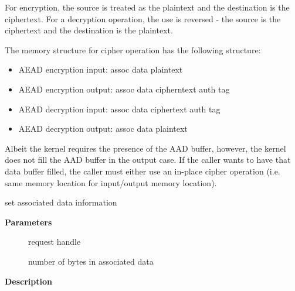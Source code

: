 \documentclass[a4paper,8pt,english]{sphinxmanual}
\begin{document}
For encryption, the source is treated as the plaintext and the
destination is the ciphertext. For a decryption operation, the use is
reversed - the source is the ciphertext and the destination is the plaintext.

The memory structure for cipher operation has the following structure:
\begin{itemize}
\item {} 
AEAD encryption input:  assoc data \textbar{}\textbar{} plaintext

\item {} 
AEAD encryption output: assoc data \textbar{}\textbar{} cipherntext \textbar{}\textbar{} auth tag

\item {} 
AEAD decryption input:  assoc data \textbar{}\textbar{} ciphertext \textbar{}\textbar{} auth tag

\item {} 
AEAD decryption output: assoc data \textbar{}\textbar{} plaintext

\end{itemize}

Albeit the kernel requires the presence of the AAD buffer, however,
the kernel does not fill the AAD buffer in the output case. If the
caller wants to have that data buffer filled, the caller must either
use an in-place cipher operation (i.e. same memory location for
input/output memory location).

\begin{fulllineitems}
\label{crypto/api-aead:c.aead_request_set_ad}
set associated data information

\end{fulllineitems}


\textbf{Parameters}
\begin{description}
\item[{}] \leavevmode
request handle

\item[{}] \leavevmode
number of bytes in associated data

\end{description}

\textbf{Description}
\end{document}
